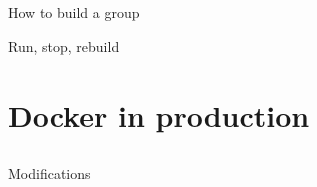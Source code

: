 \documentclass{beamer}
\begin{document}
    \subsection{}
    \begin{frame}{How to build a group}
    \end{frame}
    \begin{frame}{Run, stop, rebuild}
    \end{frame}
    \section{Docker in production}
    \subsection{}
    \begin{frame}{Modifications}
    \end{frame}
\end{document}
